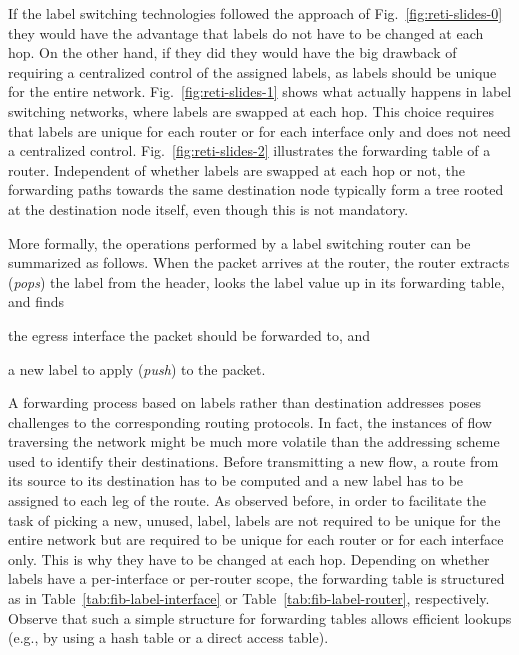 \documentclass{article}
\begin{document}
If the label switching technologies 
followed the approach of Fig.~\ref{fig:reti-slides-0} they would have the 
advantage that labels do not have to be changed at each hop. On the other hand, if they 
did they would have the big drawback of 
requiring a centralized control of the assigned labels, as labels should be unique for the entire network. 
Fig.~\ref{fig:reti-slides-1} shows what actually happens in label switching 
networks, where labels are swapped at each hop. This choice requires that labels 
are unique for each router or for each interface only and does not need a 
centralized control. Fig.~\ref{fig:reti-slides-2} illustrates the forwarding 
table of a router. Independent of whether labels are swapped at 
each hop or not, the forwarding paths towards the same destination node 
typically form a tree rooted at the destination node itself, even though this is 
not mandatory.

More formally, the operations performed by a label switching router can be summarized as follows.
When the packet arrives at the router, the router extracts (\emph{pops}) the label 
from the header, looks the label value up in its forwarding table, and finds
\begin{inparaenum}[(i)]
 \item the egress interface the packet should be forwarded to, and
 \item a new label to apply (\emph{push}) to the packet.
\end{inparaenum}

A forwarding process based on labels rather than destination addresses poses 
challenges to the corresponding routing protocols. In fact, the instances of 
flow traversing the network might be much more volatile than the addressing scheme 
used to identify their destinations. Before transmitting a new flow, a route 
from its source to its destination has to be computed and a new label has to be 
assigned to each leg of the route. As observed before, in order to facilitate the task of
picking a 
new, unused, label, labels are not required to be unique for the entire network but are
required to be unique for each router or for 
each interface only. This is why they have to be changed at each hop.      %
Depending on whether labels have a per-interface or per-router scope, the 
forwarding table is structured as in Table~\ref{tab:fib-label-interface} or 
Table~\ref{tab:fib-label-router}, respectively. 
Observe that such a simple structure for forwarding tables 
allows efficient lookups (e.g., by using a hash table or a direct access table).
\end{document}
